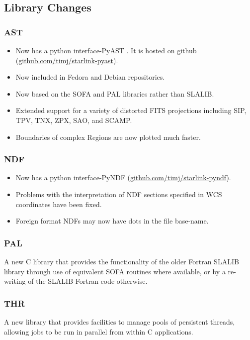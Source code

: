 \subsection{Library Changes}

\subsubsection{AST}
\begin{itemize}
\item Now has a python interface-PyAST \citep{P011_adassxxi}. It is
hosted on github (\url{github.com/timj/starlink-pyast}).
\item Now included in Fedora and Debian repositories.
\item Now based on the SOFA and PAL libraries rather than SLALIB.
\item Extended support for a variety of distorted FITS projections including SIP, TPV, TNX, ZPX, SAO, and SCAMP.
\item Boundaries of complex Regions are now plotted much faster.
\end{itemize}

\subsubsection{NDF}
\begin{itemize}
\item Now has a python interface-PyNDF (\url{github.com/timj/starlink-pyndf}).
\item Problems with the interpretation of NDF sections specified in WCS coordinates have been fixed.
\item Foreign format NDFs may now have dots in the file base-name.
\end{itemize}

\subsubsection{PAL}
A new C library that provides the functionality of the older Fortran SLALIB library through use of equivalent SOFA routines where available, or by a re-writing of the SLALIB Fortran code otherwise.

\subsubsection{THR}
A new library that provides facilities to manage pools of persistent threads, allowing jobs to be run in parallel from within C applications.

